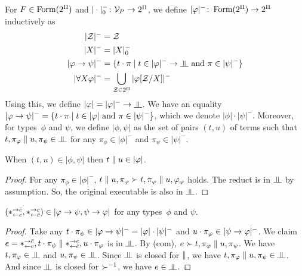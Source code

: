 \renewcommand{\sem}[1]{|{#1}|}
\newcommand{\nsem}[1]{\sem{#1}^-}
For $F\in\mathop{\text{Form}}(2^\Pi)$ and $|\cdot|^-_0\colon\mathcal V_P\rightarrow 2^\Pi$,
we define $\nsem{\phi}\colon \form(2^\Pi)\rightarrow
2^\Pi$ inductively as
\begin{align*}
 \nsem{\mathcal Z} &= \mathcal Z \\
 \nsem{X}&= |X|_0^- \\
 \nsem{\phi\imp\psi}&=
 \{t\cdot\pi\mid t\in\nsem\phi\rightarrow\bbot \text{ and }\pi\in\nsem\psi\}
 \\
 \nsem{\forall X\phi}&=
 \bigcup_{\mathcal Z\in 2^\Pi} \nsem{\phi[\mathcal Z/X]}
\end{align*}
Using this, we define $\sem \phi=\nsem{\phi}\rightarrow\bbot$.
We have an equality
$\nsem{\phi\imp\psi} = \{t\cdot\pi\mid
t\in\sem\phi\text{ and }\pi\in\nsem\psi\}$, which we denote
$\sem{\phi}\cdot\nsem{\psi}$.
Moreover, for types~$\phi$ and $\psi$, we define $\sem{\phi,\psi}$
as the set of pairs $(t,u)$ of terms such that
$t,\pi_\phi\conc u,\pi_\psi\in\bbot$ for any $\pi_\phi\in\nsem\phi$
and $\pi_\psi\in\nsem\psi$.

\begin{proposition}
 \label{squash}
 When $(t,u)\in\sem{\phi,\psi}$ then $t\conc u\in\sem\phi$.
\end{proposition}
\begin{proof}
 For any $\pi_\phi\in\nsem\phi$,
 $t\parallel u,\pi_\varphi\succ t,\pi_\varphi\parallel u,\varphi_\varphi$ holds.
 The reduct is in $\bbot$ by assumption.
 So, the original executable is also in $\bbot$.
\end{proof}

\newcommand{\comodL}{\comod c{\co c}}
\newcommand{\comodR}{\comod{\co c}c}
\begin{proposition}
 \label{comod-type}
 $(\comodL, \comodR)\in\sem{\phi\imp\psi,\psi\imp\phi}$
 for any types~$\phi$ and $\psi$.
\end{proposition}
\begin{proof}
 Take any $t\cdot\pi_\psi\in\nsem{\phi\imp\psi} =
 \sem\phi\cdot\nsem\psi$
 and $u\cdot\pi_\phi\in\nsem{\psi\imp\phi}$.
 We claim $e=\comodL,t\cdot\pi_\psi\conc\comodR,u\cdot\pi_\phi$ is in
 $\bbot$.
 By (com), $e\succ t,\pi_\varphi\parallel u,\pi_\psi$.
 We have $t,\pi_\phi\in\bbot$ and $u,\pi_\psi\in\bbot$.
 Since $\bbot$ is closed for $\parallel$,
 we have $t,\pi_\phi\conc u,\pi_\psi\in\bbot$.
 And since $\bbot$ is closed for $\succ^{-1}$,
 we have $e\in\bbot$.
\end{proof}

